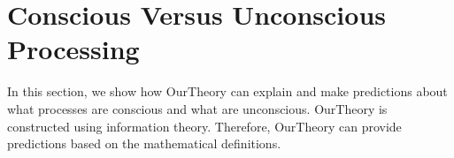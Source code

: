 \documentclass[utf8]{article}
\newcommand{\needfig}[1]{%
			\ifthenelse{\equal{#1}{}}{%
				\todo[color=White, linecolor=Orange, bordercolor=RedOrange]{\textcolor{RedOrange}{Fig}}}{%
				\todo[color=White, linecolor=Orange, bordercolor=RedOrange]{\textcolor{RedOrange}{Fig: #1}}%
			}%
		}
\begin{document}
    
    
	\section{Conscious Versus Unconscious Processing}\label{sec:Conscious versus Unconscious Processing}
	    In this section, we show how \ac{OurTheory} can explain and make predictions about what processes are conscious and what are unconscious. \ac{OurTheory} is constructed using information theory. Therefore, \ac{OurTheory} can provide predictions based on the mathematical definitions. 
		
\end{document}
